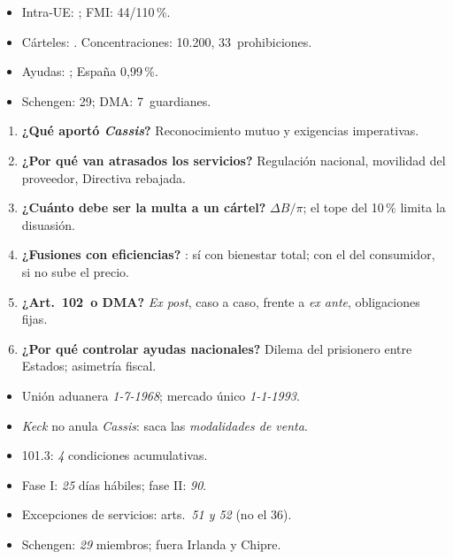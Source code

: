 \documentclass{article}
\begin{document}
\begin{columnas}
\anexorepaso
{}
\begin{itemize}
\item Intra-UE: ; FMI: 44/110\,\%.
\item Cárteles: . Concentraciones: 10.200, 33~prohibiciones.
\item Ayudas: ; España 0,99\,\%.
\item Schengen: 29; DMA: 7~guardianes.
\end{itemize}
\begin{enumerate}
\item \textbf{¿Qué aportó \emph{Cassis}?} Reconocimiento mutuo y exigencias imperativas.
\item \textbf{¿Por qué van atrasados los servicios?} Regulación nacional, movilidad del proveedor, Directiva rebajada.
\item \textbf{¿Cuánto debe ser la multa a un cártel?} $\Delta B/\pi$; el tope del 10\,\% limita la disuasión.
\item \textbf{¿Fusiones con eficiencias?} : sí con bienestar total; con el del consumidor, si no sube el precio.
\item \textbf{¿Art.~102~o DMA?} \emph{Ex post}, caso a caso, frente a \emph{ex ante}, obligaciones fijas.
\item \textbf{¿Por qué controlar ayudas nacionales?} Dilema del prisionero entre Estados; asimetría fiscal.
\end{enumerate}
\begin{trampa}
\begin{itemize}
\item Unión aduanera \emph{1-7-1968}; mercado único \emph{1-1-1993}.
\item \emph{Keck} no anula \emph{Cassis}: saca las \emph{modalidades de venta}.
\item 101.3: \emph{4} condiciones acumulativas.
\item Fase I: \emph{25} días hábiles; fase II: \emph{90}.
\item Excepciones de servicios: arts.~\emph{51 y 52} (no el 36).
\item Schengen: \emph{29} miembros; fuera Irlanda y Chipre.
\end{itemize}
\end{trampa}

\end{columnas}
\end{document}
